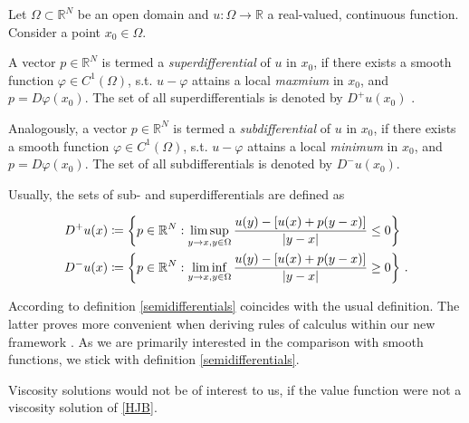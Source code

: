 	\begin{definition}
		\label{semidifferentials}
		Let $ \Omega \subset \mathbb{R}^N $ be an open domain and $ u : \Omega \to \mathbb{R} $ a real-valued, continuous function. Consider a point $ x_0 \in \Omega $. 
		
		A vector $ p \in \mathbb{R}^N $ is termed a \emph{superdifferential} of $ u $ in $ x_0 $, if there exists a smooth function $ \varphi \in C^{1}(\Omega) $, s.t. $ u - \varphi $ attains a local \emph{maxmium} in $ x_0 $, and $ p = D \varphi(x_0) $. The set of all superdifferentials is denoted by $ D^{+}u(x_0) $ .
		
		Analogously, a vector $ p \in \mathbb{R}^N $ is termed a \emph{subdifferential} of $ u $ in $ x_0 $, if there exists a smooth function $ \varphi \in C^{1}(\Omega) $, s.t. $ u - \varphi $ attains a local \emph{minimum} in $ x_0 $, and $ p = D \varphi(x_0) $. The set of all subdifferentials is denoted by $ D^{-}u(x_0) $.
	\end{definition}

	\begin{remark}
		Usually, the sets of sub- and superdifferentials are defined as
		
		\begin{align*}
			D^{+} u(x) &\coloneqq \bigg\{p \in \mathbb{R}^N : \limsup\limits_{y \to x, y \in \Omega} \frac{u(y) - \left[u(x) + p(y - x) \right]}{\left\lvert {y - x} \right\rvert} \leq 0 \bigg\} \\
			D^{-} u(x) &\coloneqq \bigg\{p \in \mathbb{R}^N : \liminf\limits_{y \to x, y \in \Omega} \frac{u(y) - \left[u(x) + p(y - x) \right]}{\left\lvert {y - x} \right\rvert} \geq 0 \bigg\} \ .
		\end{align*}
		
		According to \cite[lemma 1.7, p.~29]{bardi2008optimal} definition \ref{semidifferentials} coincides with the usual definition. The latter proves more convenient when deriving rules of calculus within our new framework \cite[cf. p.~37 et sqq]{bardi2008optimal}. As we are primarily interested in the comparison with smooth functions, we stick with definition \ref{semidifferentials}.
	\end{remark}

	Viscosity solutions would not be of interest to us, if the value function were not a viscosity solution of \eqref{HJB}.
	
